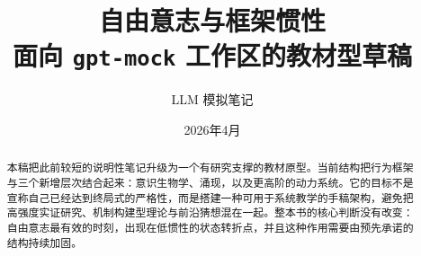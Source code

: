 


\hypersetup{pageanchor=false}

\title{\textbf{自由意志与框架惯性}\\[6pt]
       \large 面向 \texttt{gpt-mock} 工作区的教材型草稿}
\author{LLM 模拟笔记}
\date{2026年4月}
\maketitle

\begin{abstract}
本稿把此前较短的说明性笔记升级为一个有研究支撑的教材原型。当前结构把行为框架与三个新增层次结合起来：意识生物学、涌现，以及更高阶的动力系统。它的目标不是宣称自己已经达到终局式的严格性，而是搭建一种可用于系统教学的手稿架构，避免把高强度实证研究、机制构建型理论与前沿猜想混在一起。整本书的核心判断没有改变：自由意志最有效的时刻，出现在低惯性的状态转折点，并且这种作用需要由预先承诺的结构持续加固。
\end{abstract}

\tableofcontents
\clearpage
\hypersetup{pageanchor=true}












\appendix




